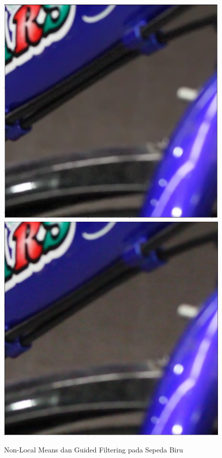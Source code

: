 \documentclass[11pt, a4paper, final]{report}
\begin{document}
\begin{figure}[H]
\centering
\includegraphics[scale=0.4]{assets/BlueNLMeans.png}
\includegraphics[scale=0.4]{assets/BlueGuided.png}
\caption{Non-Local Means dan Guided Filtering pada Sepeda Biru}
\end{figure}
\end{document}
